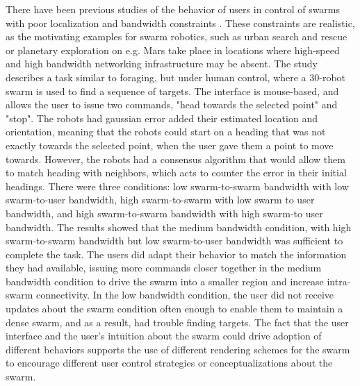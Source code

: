 There have been previous studies of the behavior of users in control of swarms with poor localization and bandwidth constraints \citep{nunnally2012human}. 
These constraints are realistic, as the motivating examples for swarm robotics, such as urban search and rescue or planetary exploration on e.g. Mars take place in locations where high-speed and high bandwidth networking infrastructure may be absent. 
The study describes a task similar to foraging, but under human control, where a 30-robot swarm is used to find a sequence of targets. 
The interface is mouse-based, and allows the user to issue two commands, "head towards the selected point" and "stop". 
The robots had gaussian error added their estimated location and orientation, meaning that the robots could start on a heading that was not exactly towards the selected point, when the user gave them a point to move towards. 
However, the robots had a consensus algorithm that would allow them to match heading with neighbors, which acts to counter the error in their initial headings. 
There were three conditions: low swarm-to-swarm bandwidth with low swarm-to-user bandwidth, high swarm-to-swarm with low swarm to user bandwidth, and high swarm-to-swarm bandwidth with high swarm-to user bandwidth.
The results showed that the medium bandwidth condition, with high swarm-to-swarm bandwidth but low swarm-to-user bandwidth was sufficient to complete the task. 
The users did adapt their behavior to match the information they had available, issuing more commands closer together in the medium bandwidth condition to drive the swarm into a smaller region and increase intra-swarm connectivity. 
In the low bandwidth condition, the user did not receive updates about the swarm condition often enough to enable them to maintain a dense swarm, and as a result, had trouble finding targets. 
The fact that the user interface and the user's intuition about the swarm could drive adoption of different behaviors supports the use of different rendering schemes for the swarm to encourage different user control strategies or conceptualizations about the swarm. 


